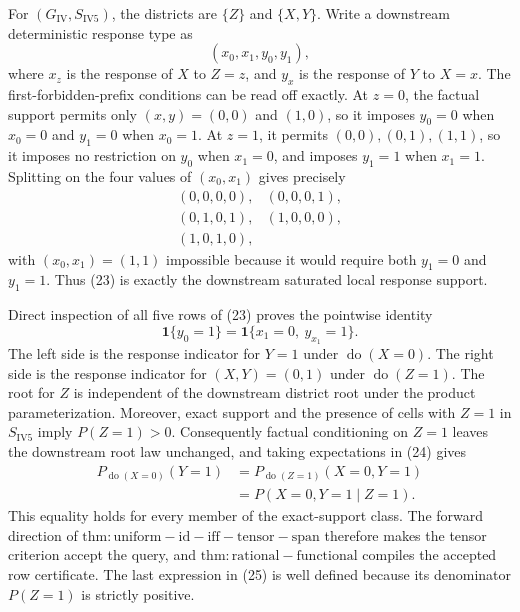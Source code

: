 For \((G_{\mathrm{IV}},S_{\mathrm{IV5}})\), the districts are \(\{Z\}\) and \(\{X,Y\}\).  Write a downstream deterministic response type as
\[
(x_0,x_1,y_0,y_1),
\]
where \(x_z\) is the response of \(X\) to \(Z=z\), and \(y_x\) is the response of \(Y\) to \(X=x\).  The first-forbidden-prefix conditions can be read off exactly.  At \(z=0\), the factual support permits only \((x,y)=(0,0)\) and \((1,0)\), so it imposes \(y_0=0\) when \(x_0=0\) and \(y_1=0\) when \(x_0=1\).  At \(z=1\), it permits \((0,0),(0,1),(1,1)\), so it imposes no restriction on \(y_0\) when \(x_1=0\), and imposes \(y_1=1\) when \(x_1=1\).  Splitting on the four values of \((x_0,x_1)\) gives precisely
\[
\begin{array}{cc}
(0,0,0,0),&(0,0,0,1),\\
(0,1,0,1),&(1,0,0,0),\\
(1,0,1,0),
\end{array}                                                    \tag{23}
\]
with \((x_0,x_1)=(1,1)\) impossible because it would require both \(y_1=0\) and \(y_1=1\).  Thus (23) is exactly the downstream saturated local response support.

Direct inspection of all five rows of (23) proves the pointwise identity
\[
\mathbf 1\{y_0=1\}
=\mathbf 1\{x_1=0,\ y_{x_1}=1\}.                            \tag{24}
\]
The left side is the response indicator for \(Y=1\) under \(\operatorname{do}(X=0)\).  The right side is the response indicator for \((X,Y)=(0,1)\) under \(\operatorname{do}(Z=1)\).  The root for \(Z\) is independent of the downstream district root under the product parameterization.  Moreover, exact support and the presence of cells with \(Z=1\) in \(S_{\mathrm{IV5}}\) imply \(P(Z=1)>0\).  Consequently factual conditioning on \(Z=1\) leaves the downstream root law unchanged, and taking expectations in (24) gives
\[
\begin{aligned}
P_{\operatorname{do}(X=0)}(Y=1)
&=P_{\operatorname{do}(Z=1)}(X=0,Y=1)\\
&=P(X=0,Y=1\mid Z=1).                                        \tag{25}
\end{aligned}
\]
This equality holds for every member of the exact-support class.  The forward direction of \(\mathrm{thm:uniform-id-iff-tensor-span}\) therefore makes the tensor criterion accept the query, and \(\mathrm{thm:rational-functional}\) compiles the accepted row certificate.  The last expression in (25) is well defined because its denominator \(P(Z=1)\) is strictly positive.

